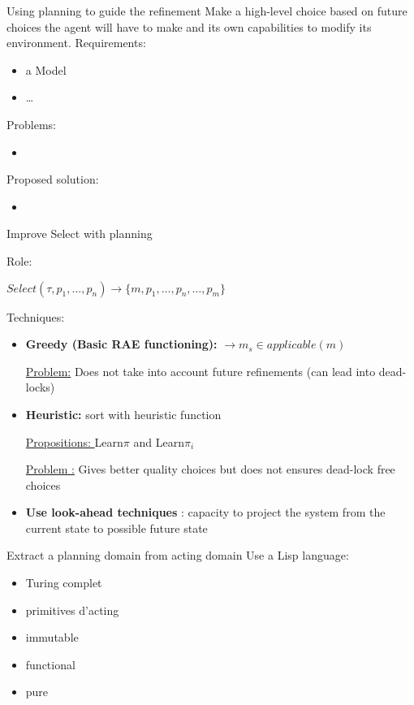 \begin{frame}{Using planning to guide the refinement}
    Make a high-level choice based on future choices the agent will have to make and its own capabilities to modify its environment.
    Requirements:
    \begin{itemize}
        \item a Model
        \item \dots
    \end{itemize}
    Problems: 
    \begin{itemize}
        \item 
    \end{itemize}
    Proposed solution:
    \begin{itemize}
        \item 
    \end{itemize}
\end{frame}
\begin{frame}{Improve Select with planning}
    \begin{center}
        
    Role:
    
    $Select(\tau, p_1,\dots,p_n) \rightarrow \{m, p_1, \dots, p_n,\dots,p_m\}$

    \end{center}

    Techniques:
    \begin{itemize}

    \item \textbf{Greedy (Basic RAE functioning):} $\rightarrow m_s \in applicable(m)$
    \pause
    
    \underline{Problem:} Does not take into account future refinements (can lead into dead-locks)
    \pause
    
    \item \textbf{Heuristic:} sort with heuristic function
    \pause
    
    \underline{Propositions: } Learn$\pi$ and Learn$\pi_i$
    \pause
    
    \underline{Problem :} Gives better quality choices but does not ensures dead-lock free choices
    \pause
    \item \textbf<5->{Use look-ahead techniques} : capacity to project the system from the current state to possible future state

    \end{itemize}
\end{frame}

\begin{frame}{Extract a planning domain from acting domain}
    Use a Lisp language:
    \begin{itemize}
        \item Turing complet
        \item primitives d'acting
        \item immutable
        \item functional
        \item pure
    \end{itemize}
\end{frame}